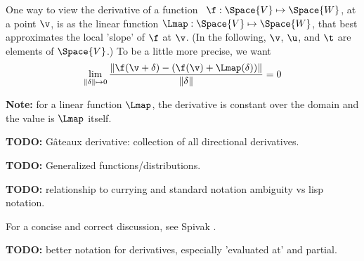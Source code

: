\setcounter{currentlevel}{\value{baseSectionLevel}}
\label{sec:Derivatives}

One way to view the derivative of a 
function~\cite{wiki:Frechet-derivative}
$\f:\Space{V} \mapsto \Space{W}$,
at a point $\v$,
is as the linear function $\Lmap:\Space{V} \mapsto \Space{W}$,
that best approximates the local 'slope' of $\f$ at $\v$.
(In the following, $\v$, $\u$, and $\t$ are elements of $\Space{V}$.)
To be a little more precise, we want
\begin{equation}
\lim_{ \|{\bf \delta}  \| \mapsto 0}
\frac{ \| \f(\v + {\bf \delta}) - (\f(\v) + \Lmap({\bf\delta})) \|}
{\|{\bf \delta}  \| }
 = 0
\end{equation}

\textbf{Note:} for a linear function $\Lmap$,
the derivative is constant over the domain
and the value is $\Lmap$ itself.

\textbf{TODO:} G\^{a}teaux derivative: collection of all
directional derivatives.

\textbf{TODO:} Generalized functions/distributions.

\textbf{TODO:}
relationship to currying and standard notation ambiguity vs
lisp notation.

For a concise and correct discussion, 
see Spivak \cite[chapter 2]{spivak-1965}.

\textbf{TODO:} better notation for derivatives, especially 
'evaluated at' and partial.

